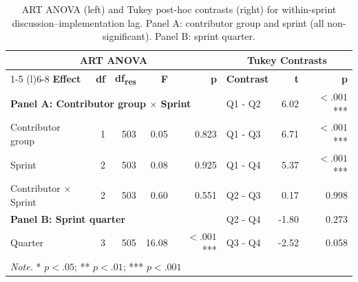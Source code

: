 \begin{table}[ht]
\centering
\scriptsize
\setlength{\tabcolsep}{4pt}
\renewcommand{\arraystretch}{0.88}
\caption{ART ANOVA (left) and Tukey post-hoc contrasts (right) for within-sprint discussion--implementation lag. Panel A: contributor group and sprint (all non-significant). Panel B: sprint quarter.}
\label{tab:art_anova_lag}
\begin{tabular}{l r r r r @{\hskip 8pt} l r r}
\toprule
\multicolumn{5}{c}{\textbf{ART ANOVA}} & \multicolumn{3}{c}{\textbf{Tukey Contrasts}} \\
\cmidrule(r){1-5} \cmidrule(l){6-8}
\textbf{Effect} & \textbf{df} & \textbf{df\textsubscript{res}} & \textbf{F} & \textbf{p} & \textbf{Contrast} & \textbf{t} & \textbf{p} \\
\midrule
\multicolumn{5}{l}{\textbf{Panel A: Contributor group $\times$ Sprint}} & Q1 - Q2 & 6.02 & $< .001$*** \\
Contributor group & 1 & 503 & 0.05 & 0.823 & Q1 - Q3 & 6.71 & $< .001$*** \\
Sprint & 2 & 503 & 0.08 & 0.925 & Q1 - Q4 & 5.37 & $< .001$*** \\
Contributor $\times$ Sprint & 2 & 503 & 0.60 & 0.551 & Q2 - Q3 & 0.17 & 0.998 \\
\midrule
\multicolumn{5}{l}{\textbf{Panel B: Sprint quarter}} & Q2 - Q4 & -1.80 & 0.273 \\
Quarter & 3 & 505 & 16.08 & $< .001$*** & Q3 - Q4 & -2.52 & 0.058 \\
\midrule
\multicolumn{8}{l}{\textit{Note.} * $p < .05$; ** $p < .01$; *** $p < .001$} \\
\bottomrule
\end{tabular}
\end{table}
